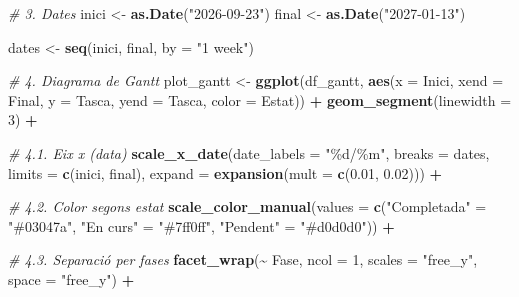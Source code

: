 \documentclass[CAT]{TFUOC}%
\newenvironment{Shaded}{\begin{snugshade}}{\end{snugshade}}
\newcommand{\AttributeTok}[1]{\textcolor[rgb]{0.13,0.29,0.53}{#1}}
\newcommand{\CommentTok}[1]{\textcolor[rgb]{0.56,0.35,0.01}{\textit{#1}}}
\newcommand{\DecValTok}[1]{\textcolor[rgb]{0.00,0.00,0.81}{#1}}
\newcommand{\FloatTok}[1]{\textcolor[rgb]{0.00,0.00,0.81}{#1}}
\newcommand{\FunctionTok}[1]{\textcolor[rgb]{0.13,0.29,0.53}{\textbf{#1}}}
\newcommand{\NormalTok}[1]{#1}
\newcommand{\OtherTok}[1]{\textcolor[rgb]{0.56,0.35,0.01}{#1}}
\newcommand{\SpecialCharTok}[1]{\textcolor[rgb]{0.81,0.36,0.00}{\textbf{#1}}}
\newcommand{\StringTok}[1]{\textcolor[rgb]{0.31,0.60,0.02}{#1}}
\begin{document}
\begin{Shaded}
\begin{Highlighting}[]
\CommentTok{\# 3. Dates}
\NormalTok{inici }\OtherTok{\textless{}{-}} \FunctionTok{as.Date}\NormalTok{(}\StringTok{"2026{-}09{-}23"}\NormalTok{)}
\NormalTok{final }\OtherTok{\textless{}{-}} \FunctionTok{as.Date}\NormalTok{(}\StringTok{"2027{-}01{-}13"}\NormalTok{)}

\NormalTok{dates }\OtherTok{\textless{}{-}} \FunctionTok{seq}\NormalTok{(inici, final, }\AttributeTok{by =} \StringTok{"1 week"}\NormalTok{)}

\CommentTok{\# 4. Diagrama de Gantt}
\NormalTok{plot\_gantt }\OtherTok{\textless{}{-}} \FunctionTok{ggplot}\NormalTok{(df\_gantt, }
                     \FunctionTok{aes}\NormalTok{(}\AttributeTok{x =}\NormalTok{ Inici, }\AttributeTok{xend =}\NormalTok{ Final,}
                         \AttributeTok{y =}\NormalTok{ Tasca, }\AttributeTok{yend =}\NormalTok{ Tasca,}
                         \AttributeTok{color =}\NormalTok{ Estat)) }\SpecialCharTok{+}
  \FunctionTok{geom\_segment}\NormalTok{(}\AttributeTok{linewidth =} \DecValTok{3}\NormalTok{) }\SpecialCharTok{+}
  
  \CommentTok{\# 4.1. Eix x (data)}
  \FunctionTok{scale\_x\_date}\NormalTok{(}\AttributeTok{date\_labels =} \StringTok{"\%d/\%m"}\NormalTok{,}
               \AttributeTok{breaks =}\NormalTok{ dates,}
               \AttributeTok{limits =} \FunctionTok{c}\NormalTok{(inici, final),}
               \AttributeTok{expand =} \FunctionTok{expansion}\NormalTok{(}\AttributeTok{mult =} \FunctionTok{c}\NormalTok{(}\FloatTok{0.01}\NormalTok{, }\FloatTok{0.02}\NormalTok{))) }\SpecialCharTok{+}
  
  \CommentTok{\# 4.2. Color segons estat}
  \FunctionTok{scale\_color\_manual}\NormalTok{(}\AttributeTok{values =} \FunctionTok{c}\NormalTok{(}\StringTok{"Completada"} \OtherTok{=} \StringTok{"\#03047a"}\NormalTok{,}
                                \StringTok{"En curs"} \OtherTok{=} \StringTok{"\#7ff0ff"}\NormalTok{,}
                                \StringTok{"Pendent"} \OtherTok{=} \StringTok{"\#d0d0d0"}\NormalTok{)) }\SpecialCharTok{+}
  
  \CommentTok{\# 4.3. Separació per fases}
  \FunctionTok{facet\_wrap}\NormalTok{(}\SpecialCharTok{\textasciitilde{}}\NormalTok{ Fase, }\AttributeTok{ncol =} \DecValTok{1}\NormalTok{, }\AttributeTok{scales =} \StringTok{"free\_y"}\NormalTok{, }
             \AttributeTok{space =} \StringTok{"free\_y"}\NormalTok{) }\SpecialCharTok{+}
  

\end{Highlighting}
\end{Shaded}
\end{document}
